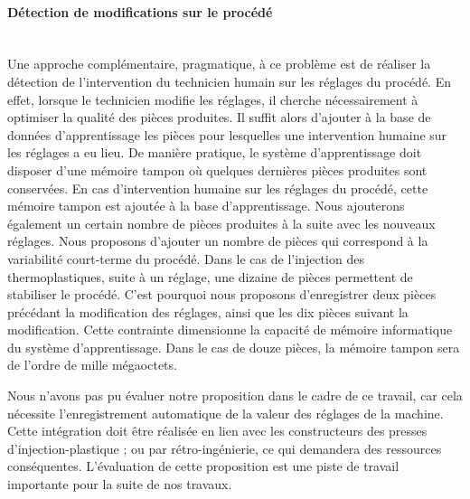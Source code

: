 \paragraph{Détection de modifications sur le procédé}\mbox{} \\
Une approche complémentaire, pragmatique, à ce problème est de réaliser la détection de l'intervention du technicien humain sur les réglages du procédé.
En effet, lorsque le technicien modifie les réglages, il cherche nécessairement à optimiser la qualité des pièces produites.
Il suffit alors d'ajouter à la base de données d'apprentissage les pièces pour lesquelles une intervention humaine sur les réglages a eu lieu.
De manière pratique, le système d'apprentissage doit disposer d'une mémoire tampon où quelques dernières pièces produites sont conservées.
En cas d'intervention humaine sur les réglages du procédé, cette mémoire tampon est ajoutée à la base d'apprentissage.
Nous ajouterons également un certain nombre de pièces produites à la suite avec les nouveaux réglages.
Nous proposons d'ajouter un nombre de pièces qui correspond à la variabilité court-terme du procédé.
Dans le cas de l'injection des thermoplastiques, suite à un réglage, une dizaine de pièces permettent de stabiliser le procédé.
C'est pourquoi nous proposons d'enregistrer deux pièces précédant la modification des réglages, ainsi que les dix pièces suivant la modification.
Cette contrainte dimensionne la capacité de mémoire informatique du système d'apprentissage.
Dans le cas de douze pièces, la mémoire tampon sera de l'ordre de mille mégaoctets.

Nous n'avons pas pu évaluer notre proposition dans le cadre de ce travail, car cela nécessite l'enregistrement automatique de la valeur des réglages de la machine.
Cette intégration doit être réalisée en lien avec les constructeurs des presses d'injection-plastique ; ou par rétro-ingénierie, ce qui demandera des ressources conséquentes.
L'évaluation de cette proposition est une piste de travail importante pour la suite de nos travaux.

